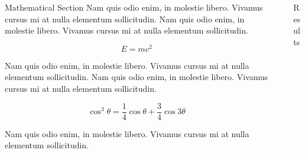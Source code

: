 \documentclass[final]{beamer}
\newlength{\sepwid}
\newlength{\onecolwid}
\begin{document}
\begin{frame}[t]
\begin{columns}[t]
\begin{column}{\onecolwid}
\begin{block}{Mathematical Section}
Nam quis odio enim, in molestie libero. Vivamus cursus mi at nulla elementum sollicitudin. Nam quis odio enim, in molestie libero. Vivamus cursus mi at nulla elementum sollicitudin.
  
\begin{equation}
E = mc^{2}
\label{eqn:Einstein}
\end{equation}

Nam quis odio enim, in molestie libero. Vivamus cursus mi at nulla elementum sollicitudin. Nam quis odio enim, in molestie libero. Vivamus cursus mi at nulla elementum sollicitudin.

\begin{equation}
\cos^3 \theta =\frac{1}{4}\cos\theta+\frac{3}{4}\cos 3\theta
\label{eq:refname}
\end{equation}

Nam quis odio enim, in molestie libero. Vivamus cursus mi at nulla elementum sollicitudin.

\end{block}


\end{column} %

\begin{column}{\sepwid}
\end{column} %

\begin{column}{\onecolwid} %

%
\begin{block}{Results}


\end{block}
\end{column}
\end{columns}
\end{frame}
\end{document}
